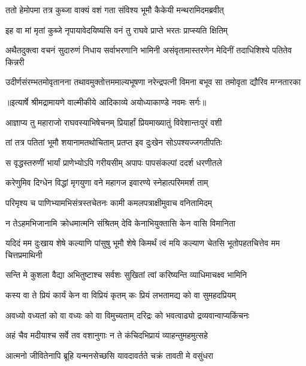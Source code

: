 \twolineshloka
{ततो हेमोपमा तत्र कुब्जा वाक्यं वशं गता}
{संविश्य भूमौ कैकेयी मन्थरामिदमब्रवीत्} %

\twolineshloka
{इह वा मां मृतां कुब्जे नृपायावेदयिष्यसि}
{वनं तु राघवे प्राप्ते भरतः प्राप्स्यति क्षितिम्} %

\fourlineindentedshloka
{अथैतदुक्त्वा वचनं सुदारुणं}
{ निधाय सर्वाभरणानि भामिनी}
{असंवृतामास्तरणेन मेदिनीं}
{ तदाधिशिश्ये पतितेव किन्नरी} %

\fourlineindentedshloka
{उदीर्णसंरम्भतमोवृतानना}
{ तथावमुक्तोत्तममाल्यभूषणा}
{नरेन्द्रपत्नी विमना बभूव सा}
{ तमोवृता द्यौरिव मग्नतारका} %


{॥इत्यार्षे श्रीमद्रामायणे वाल्मीकीये आदिकाव्ये अयोध्याकाण्डे नवमः सर्गः॥}


\twolineshloka
{आज्ञाप्य तु महाराजो राघवस्याभिषेचनम्}
{प्रियार्हां प्रियमाख्यातुं विवेशान्तःपुरं वशी} %

\twolineshloka
{तां तत्र पतितां भूमौ शयानामतथोचिताम्}
{प्रतप्त इव दुःखेन सोऽपश्यज्जगतीपतिः} %

\twolineshloka
{स वृद्धस्तरुणीं भार्यां प्राणेभ्योऽपि गरीयसीम्}
{अपापः पापसंकल्पां ददर्श धरणीतले} %

\twolineshloka
{करेणुमिव दिग्धेन विद्धां मृगयुणा वने}
{महागज इवारण्ये स्नेहात्परिममर्श ताम्} %

\twolineshloka
{परिमृश्य च पाणिभ्यामभिसंत्रस्तचेतनः}
{कामी कमलपत्राक्षीमुवाच वनितामिदम्} %

\twolineshloka
{न तेऽहमभिजानामि क्रोधमात्मनि संश्रितम्}
{देवि केनाभियुक्तासि केन वासि विमानिता} %

\threelineshloka
{यदिदं मम दुःखाय शेषे कल्याणि पांसुषु}
{भूमौ शेषे किमर्थं त्वं मयि कल्याण चेतसि}
{भूतोपहतचित्तेव मम चित्तप्रमाथिनी} %

\twolineshloka
{सन्ति मे कुशला वैद्या अभितुष्टाश्च सर्वशः}
{सुखितां त्वां करिष्यन्ति व्याधिमाचक्ष्व भामिनि} %

\twolineshloka
{कस्य वा ते प्रियं कार्यं केन वा विप्रियं कृतम्}
{कः प्रियं लभतामद्य को वा सुमहदप्रियम्} %

\twolineshloka
{अवध्यो वध्यतां को वा वध्यः को वा विमुच्यताम्}
{दरिद्रः को भवत्वाढ्यो द्रव्यवान्वाप्यकिंचनः} %

\twolineshloka
{अहं चैव मदीयाश्च सर्वे तव वशानुगाः}
{न ते कंचिदभिप्रायं व्याहन्तुमहमुत्सहे} %

\twolineshloka
{आत्मनो जीवितेनापि ब्रूहि यन्मनसेच्छसि}
{यावदावर्तते चक्रं तावती मे वसुंधरा} %

